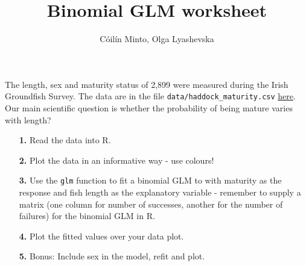 \documentclass[a4paper,12pt]{article}
\title{Binomial GLM worksheet}
\author{C\'oil\'in Minto, Olga Lyashevska}
\date{}
\begin{document}
\maketitle

\noindent 
The length, sex and maturity status of 2,899 were measured during the Irish Groundfish Survey. The data are in the file \texttt{data/haddock\_maturity.csv} \href{https://github.com/mintoc/mfrc-stats/tree/main/glm_2022/data}{here}.\\ 

Our main scientific question is whether the probability of being mature varies with length?

\vspace{1cm}
\begin{itemize}
 \item[{\bf 1.}] Read the data into R.
 \item[{\bf 2.}] Plot the data in an informative way - use colours!
 \item[{\bf 3.}] Use the \texttt{glm} function to fit a binomial GLM to with maturity as the response and fish length as the explanatory variable - remember to supply a matrix (one column for number of successes, another for the number of failures) for the binomial GLM in R.
 \item[{\bf 4.}] Plot the fitted values over your data plot.
 \item[{\bf 5.}] Bonus: Include sex in the model, refit and plot.
\end{itemize}
\end{document}
